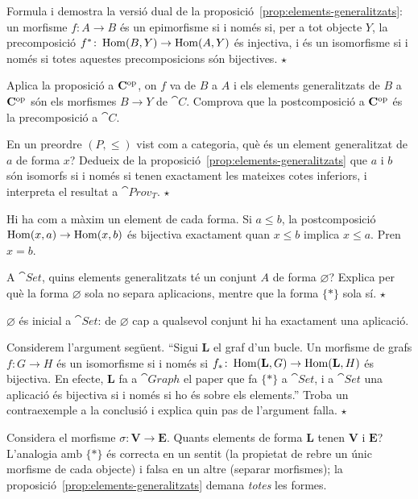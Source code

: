 \begin{exercici}
Formula i demostra la versió dual de la proposició~\ref{prop:elements-generalitzats}: un morfisme $f\colon A\to B$ és un epimorfisme si i només si, per a tot objecte $Y$, la precomposició $f^*\colon\operatorname{Hom}(B,Y)\to\operatorname{Hom}(A,Y)$ és injectiva, i és un isomorfisme si i només si totes aquestes precomposicions són bijectives. \hfill{\normalfont$\star$}
\begin{indicacio}
Aplica la proposició a $\mathbf{C}^{\mathrm{op}}$, on $f$ va de $B$ a $A$ i els elements generalitzats de $B$ a $\mathbf{C}^{\mathrm{op}}$ són els morfismes $B\to Y$ de $\cat{C}$. Comprova que la postcomposició a $\mathbf{C}^{\mathrm{op}}$ és la precomposició a $\cat{C}$.
\end{indicacio}
\end{exercici}

\begin{exercici}
En un preordre $(P,\le)$ vist com a categoria, què és un element generalitzat de $a$ de forma $x$? Dedueix de la proposició~\ref{prop:elements-generalitzats} que $a$ i $b$ són isomorfs si i només si tenen exactament les mateixes cotes inferiors, i interpreta el resultat a $\cat{Prov}_T$. \hfill{\normalfont$\star$}
\begin{indicacio}
Hi ha com a màxim un element de cada forma. Si $a\le b$, la postcomposició $\operatorname{Hom}(x,a)\to\operatorname{Hom}(x,b)$ és bijectiva exactament quan $x\le b$ implica $x\le a$. Pren $x=b$.
\end{indicacio}
\end{exercici}

\begin{exercici}
A $\cat{Set}$, quins elements generalitzats té un conjunt $A$ de forma $\varnothing$? Explica per què la forma $\varnothing$ sola no separa aplicacions, mentre que la forma $\{\ast\}$ sola sí. \hfill{\normalfont$\star$}
\begin{indicacio}
$\varnothing$ és inicial a $\cat{Set}$: de $\varnothing$ cap a qualsevol conjunt hi ha exactament una aplicació.
\end{indicacio}
\end{exercici}

\begin{exercici}
Considerem l'argument següent. \enquote{Sigui $\mathbf L$ el graf d'un bucle. Un morfisme de grafs $f\colon G\to H$ és un isomorfisme si i només si $f_*\colon\operatorname{Hom}(\mathbf L,G)\to\operatorname{Hom}(\mathbf L,H)$ és bijectiva. En efecte, $\mathbf L$ fa a $\cat{Graph}$ el paper que fa $\{\ast\}$ a $\cat{Set}$, i a $\cat{Set}$ una aplicació és bijectiva si i només si ho és sobre els elements.} Troba un contraexemple a la conclusió i explica quin pas de l'argument falla. \hfill{\normalfont$\star$}
\begin{indicacio}
Considera el morfisme $\sigma\colon\mathbf V\to\mathbf E$. Quants elements de forma $\mathbf L$ tenen $\mathbf V$ i $\mathbf E$? L'analogia amb $\{\ast\}$ és correcta en un sentit (la propietat de rebre un únic morfisme de cada objecte) i falsa en un altre (separar morfismes); la proposició~\ref{prop:elements-generalitzats} demana \emph{totes} les formes.
\end{indicacio}
\end{exercici}

